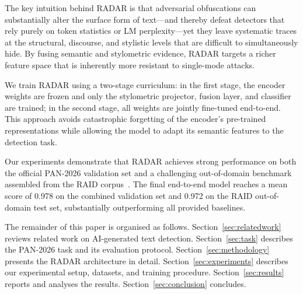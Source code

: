 The key intuition behind RADAR is that adversarial obfuscations can substantially alter the surface form of text—and thereby defeat detectors that rely purely on token statistics or LM perplexity—yet they leave systematic traces at the structural, discourse, and stylistic levels that are difficult to simultaneously hide. By fusing semantic and stylometric evidence, RADAR targets a richer feature space that is inherently more resistant to single-mode attacks.

We train RADAR using a two-stage curriculum: in the first stage, the encoder weights are frozen and only the stylometric projector, fusion layer, and classifier are trained; in the second stage, all weights are jointly fine-tuned end-to-end. This approach avoids catastrophic forgetting of the encoder's pre-trained representations while allowing the model to adapt its semantic features to the detection task.

Our experiments demonstrate that RADAR achieves strong performance on both the official PAN-2026 validation set and a challenging out-of-domain benchmark assembled from the RAID corpus~\cite{dugan:2024}. The final end-to-end model reaches a mean score of 0.978 on the combined validation set and 0.972 on the RAID out-of-domain test set, substantially outperforming all provided baselines.

The remainder of this paper is organised as follows. Section~\ref{sec:relatedwork} reviews related work on AI-generated text detection. Section~\ref{sec:task} describes the PAN-2026 task and its evaluation protocol. Section~\ref{sec:methodology} presents the RADAR architecture in detail. Section~\ref{sec:experiments} describes our experimental setup, datasets, and training procedure. Section~\ref{sec:results} reports and analyses the results. Section~\ref{sec:conclusion} concludes.
